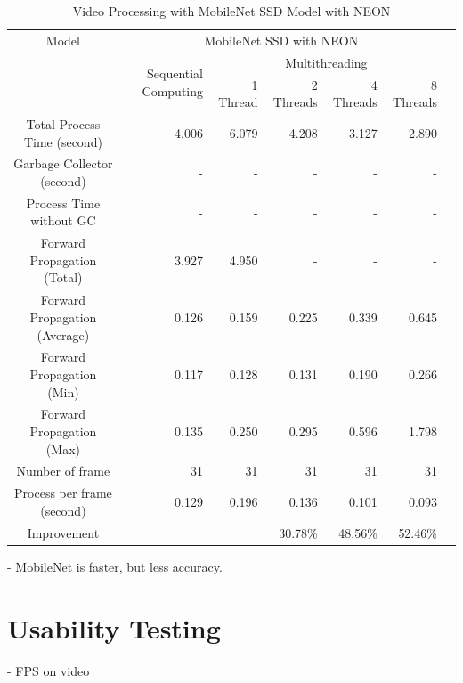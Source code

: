         \begin{table}[!htp]\centering
            \scriptsize
            \begin{tabular}{lrrrrrrr}\toprule
                \multicolumn{2}{c}{Model} &\multicolumn{5}{c}{MobileNet SSD with NEON} \\\cmidrule{1-7}
                \multicolumn{2}{c}{\multirow{2}{*}{}} &\multirow{2}{*}{Sequential Computing} &\multicolumn{4}{c}{Multithreading} \\\cmidrule{4-7}
                & & &1 Thread &2 Threads &4 Threads &8 Threads \\\midrule
                \multicolumn{2}{c}{Total Process Time (second)} &4.006 &6.079 &4.208 &3.127 &2.890 \\
                \multicolumn{2}{c}{Garbage Collector (second)} &- &- &- &- &- \\
                \multicolumn{2}{c}{Process Time without GC} &- &- &- &- &- \\
                \multicolumn{2}{c}{Forward Propagation (Total)} &3.927 &4.950 &- &- &- \\
                \multicolumn{2}{c}{Forward Propagation (Average)} &0.126 &0.159 &0.225 &0.339 &0.645 \\
                \multicolumn{2}{c}{Forward Propagation (Min)} &0.117 &0.128 &0.131 &0.190 &0.266 \\
                \multicolumn{2}{c}{Forward Propagation (Max)} &0.135 &0.250 &0.295 &0.596 &1.798 \\
                \multicolumn{2}{c}{Number of frame} &31 &31 &31 &31 &31 \\
                \multicolumn{2}{c}{Process per frame (second)} &0.129 &0.196 &0.136 &0.101 &0.093 \\
                \multicolumn{2}{c}{Improvement} & & &30.78\% &48.56\% &52.46\% \\
                \bottomrule
            \end{tabular}

            \caption{Video Processing with MobileNet SSD Model with NEON}\label{ssd:neon-performance}
        \end{table}
        - MobileNet is faster, but less accuracy.

    \section{Usability Testing}
        - FPS on video